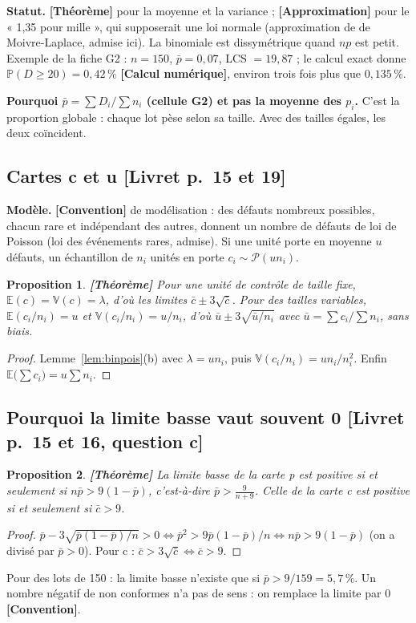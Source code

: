 \documentclass[11pt,a4paper]{article}
\theoremstyle{tq}
\newtheorem{prop}{Proposition}
\theoremstyle{remark}
\newcommand{\thm}{\textcolor{vertTQ}{\textbf{[Théorème]}}}
\newcommand{\conv}{\textcolor{orangeTQ}{\textbf{[Convention]}}}
\newcommand{\appr}{\textcolor{uimmred}{\textbf{[Approximation]}}}
\newcommand{\num}{\textcolor{uimmblue}{\textbf{[Calcul numérique]}}}
\newcommand{\liv}[1]{\textcolor{uimmblue}{\small[Livret p.~#1]}}
\newcommand{\E}{\mathbb{E}}
\newcommand{\V}{\mathbb{V}}
\renewcommand{\P}{\mathbb{P}}
\begin{document}
\textbf{Statut.} \thm{} pour la moyenne et la variance ; \appr{} pour le « 1,35 pour mille », qui supposerait une loi normale (approximation de de Moivre-Laplace, admise ici). La binomiale est dissymétrique quand $np$ est petit. Exemple de la fiche G2 : $n=150$, $\bar p=0{,}07$, LCS $=19{,}87$ ; le calcul exact donne $\P(D\ge20)=0{,}42\,\%$ \num{}, environ trois fois plus que $0{,}135\,\%$.

\textbf{Pourquoi $\bar p=\sum D_i/\sum n_i$ (cellule G2) et pas la moyenne des $p_i$.} C'est la proportion globale : chaque lot pèse selon sa taille. Avec des tailles égales, les deux coïncident.

\subsection{Cartes c et u \liv{15 et 19}}
\textbf{Modèle.} \conv{} de modélisation : des défauts nombreux possibles, chacun rare et indépendant des autres, donnent un nombre de défauts de loi de Poisson (loi des événements rares, admise). Si une unité porte en moyenne $u$ défauts, un échantillon de $n_i$ unités en porte $c_i\sim\mathcal P(un_i)$.
\begin{prop}\thm{}
Pour une unité de contrôle de taille fixe, $\E(c)=\V(c)=\lambda$, d'où les limites $\bar c\pm3\sqrt{\bar c}$. Pour des tailles variables, $\E(c_i/n_i)=u$ et $\V(c_i/n_i)=u/n_i$, d'où $\bar u\pm3\sqrt{\bar u/n_i}$ avec $\bar u=\sum c_i/\sum n_i$, sans biais.
\end{prop}
\begin{proof}
Lemme~\ref{lem:binpois}(b) avec $\lambda=un_i$, puis $\V(c_i/n_i)=un_i/n_i^2$. Enfin $\E\big(\sum c_i\big)=u\sum n_i$.
\end{proof}

\subsection{Pourquoi la limite basse vaut souvent 0 \liv{15 et 16, question c}}
\begin{prop}\thm{}
La limite basse de la carte p est positive si et seulement si $n\bar p>9(1-\bar p)$, c'est-à-dire $\bar p>\frac{9}{n+9}$. Celle de la carte c est positive si et seulement si $\bar c>9$.
\end{prop}
\begin{proof}
$\bar p-3\sqrt{\bar p(1-\bar p)/n}>0\iff\bar p^2>9\bar p(1-\bar p)/n\iff n\bar p>9(1-\bar p)$ (on a divisé par $\bar p>0$). Pour c : $\bar c>3\sqrt{\bar c}\iff\bar c>9$.
\end{proof}
Pour des lots de 150 : la limite basse n'existe que si $\bar p>9/159=5{,}7\,\%$. Un nombre négatif de non conformes n'a pas de sens : on remplace la limite par 0 \conv{}.
\end{document}
